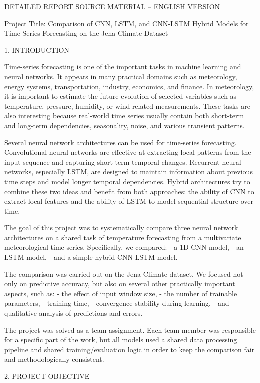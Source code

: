 DETAILED REPORT SOURCE MATERIAL – ENGLISH VERSION

Project Title:
Comparison of CNN, LSTM, and CNN-LSTM Hybrid Models for Time-Series Forecasting on the Jena Climate Dataset

1. INTRODUCTION

Time-series forecasting is one of the important tasks in machine learning and neural networks. It appears in many practical domains such as meteorology, energy systems, transportation, industry, economics, and finance. In meteorology, it is important to estimate the future evolution of selected variables such as temperature, pressure, humidity, or wind-related measurements. These tasks are also interesting because real-world time series usually contain both short-term and long-term dependencies, seasonality, noise, and various transient patterns.

Several neural network architectures can be used for time-series forecasting. Convolutional neural networks are effective at extracting local patterns from the input sequence and capturing short-term temporal changes. Recurrent neural networks, especially LSTM, are designed to maintain information about previous time steps and model longer temporal dependencies. Hybrid architectures try to combine these two ideas and benefit from both approaches: the ability of CNN to extract local features and the ability of LSTM to model sequential structure over time.

The goal of this project was to systematically compare three neural network architectures on a shared task of temperature forecasting from a multivariate meteorological time series. Specifically, we compared:
- a 1D-CNN model,
- an LSTM model,
- and a simple hybrid CNN-LSTM model.

The comparison was carried out on the Jena Climate dataset. We focused not only on predictive accuracy, but also on several other practically important aspects, such as:
- the effect of input window size,
- the number of trainable parameters,
- training time,
- convergence stability during learning,
- and qualitative analysis of predictions and errors.

The project was solved as a team assignment. Each team member was responsible for a specific part of the work, but all models used a shared data processing pipeline and shared training/evaluation logic in order to keep the comparison fair and methodologically consistent.

2. PROJECT OBJECTIVE

